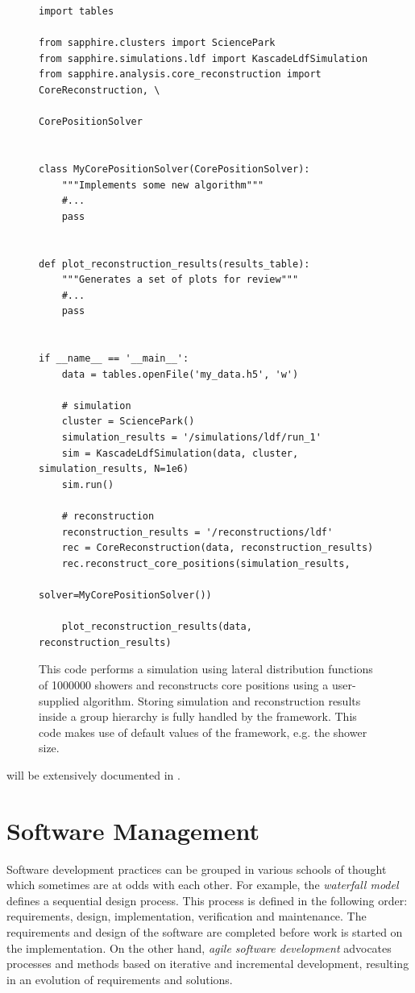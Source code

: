 \begin{figure}
\begin{verbatim}
import tables

from sapphire.clusters import SciencePark
from sapphire.simulations.ldf import KascadeLdfSimulation
from sapphire.analysis.core_reconstruction import CoreReconstruction, \
                                                  CorePositionSolver


class MyCorePositionSolver(CorePositionSolver):
    """Implements some new algorithm"""
    #...
    pass


def plot_reconstruction_results(results_table):
    """Generates a set of plots for review"""
    #...
    pass


if __name__ == '__main__':
    data = tables.openFile('my_data.h5', 'w')

    # simulation
    cluster = SciencePark()
    simulation_results = '/simulations/ldf/run_1'
    sim = KascadeLdfSimulation(data, cluster, simulation_results, N=1e6)
    sim.run()

    # reconstruction
    reconstruction_results = '/reconstructions/ldf'
    rec = CoreReconstruction(data, reconstruction_results)
    rec.reconstruct_core_positions(simulation_results,
                                   solver=MyCorePositionSolver())

    plot_reconstruction_results(data, reconstruction_results)
\end{verbatim}
\caption{  This code performs a simulation
using lateral distribution functions of \num{1000000} showers and reconstructs
core positions using a user-supplied algorithm.  Storing simulation and
reconstruction results inside a group hierarchy is fully handled by the
framework.  This code makes use of default values of the framework, e.g.
the shower size.}
\label{fig:sapphire-example}
\end{figure}

\sapphire will be extensively documented in \cite{SAPPHiRE}.


\section{Software Management}

Software development practices can be grouped in various schools of thought
which sometimes are at odds with each other.  For example, the \emph{waterfall
model} \cite{Royce:1970} defines a sequential design process.  This process is
defined in the following order: requirements, design, implementation,
verification and maintenance.  The requirements and design of the software are
completed before work is started on the implementation.  On the other
hand, \emph{agile software development} \cites{agile}{agile-manifesto} advocates
processes and methods based on iterative and incremental development, resulting
in an evolution of requirements and solutions.


